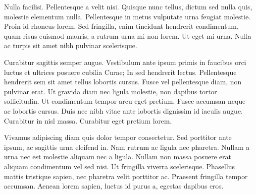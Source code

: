 Nulla facilisi. Pellentesque a velit nisi. Quisque nunc tellus, dictum sed nulla quis, molestie elementum nulla. Pellentesque in metus vulputate urna feugiat molestie. Proin id rhoncus lorem. Sed fringilla, enim tincidunt hendrerit condimentum, quam risus euismod mauris, a rutrum urna mi non lorem. Ut eget mi urna. Nulla ac turpis sit amet nibh pulvinar scelerisque.

Curabitur sagittis semper augue. Vestibulum ante ipsum primis in faucibus orci luctus et ultrices posuere cubilia Curae; In sed hendrerit lectus. Pellentesque hendrerit sem sit amet tellus lobortis cursus. Fusce vel pellentesque diam, non pulvinar erat. Ut gravida diam nec ligula molestie, non dapibus tortor sollicitudin. Ut condimentum tempor arcu eget pretium. Fusce accumsan neque ac lobortis cursus. Duis nec nibh vitae ante lobortis dignissim id iaculis augue. Curabitur in nisl massa. Curabitur eget pretium lorem.

Vivamus adipiscing diam quis dolor tempor consectetur. Sed porttitor ante ipsum, ac sagittis urna eleifend in. Nam rutrum ac ligula nec pharetra. Nullam a urna nec est molestie aliquam nec a ligula. Nullam non massa posuere erat aliquam condimentum vel sed nisi. Ut fringilla viverra scelerisque. Phasellus mattis tristique sapien, nec pharetra velit porttitor ac. Praesent fringilla tempor accumsan. Aenean lorem sapien, luctus id purus a, egestas dapibus eros.
